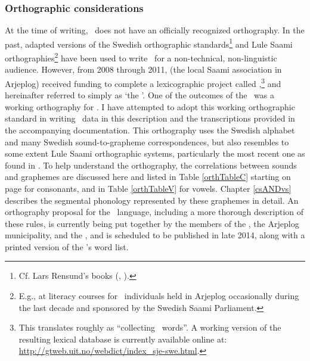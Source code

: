 \subsubsection{Orthographic considerations}\label{orthography}
At the time of writing, \PS\ does not have an officially recognized orthography. In the past, adapted versions of the Swedish orthographic standards\footnote{Cf. Lars Rensund’s books (\cite{Rensund1982}, \citeyear{Rensund1986}).} 
and Lule Saami orthographies\footnote{E.g., at literacy courses for \PS\ individuals held in Arjeplog occasionally during the last decade and sponsored by the Swedish Saami Parliament.} 
have been used to write \PS\ for a non-technical, non-linguistic audience. However, from 2008 through 2011,  (the local Saami association in Arjeplog) received funding to complete a lexicographic project called ,\footnote{This translates roughly as “collecting \PS\ words”. A working version of the resulting lexical database is currently available online at: \href{http://gtweb.uit.no/webdict/index_sje-swe.html}{http://gtweb.uit.no/webdict/index\_sje-swe.html}.} 
\citep[cf.][]{insamlingPS2011} 
and hereinafter referred to simply as ‘the \WLP’. 
One of the outcomes of the \WLP\ was a working orthography for \PS. 
I have attempted to adopt this working orthographic standard in writing \PS\ data in this description and the transcriptions provided in the accompanying documentation. This orthography uses the Swedish alphabet and many Swedish sound-to-grapheme correspondences, but also resembles to some extent Lule Saami orthographic systems, particularly the most recent one as found in \citet{KorhonenO2005}. To help understand the orthography, the correlations between sounds and graphemes are discussed here and listed in Table \ref{orthTableC} starting on page \pageref{orthTableCbegin} for consonants, and in Table \vref{orthTableV} for vowels. %
Chapter \ref{csANDvs} describes the segmental phonology represented by these graphemes in detail. 
An orthography proposal for the \PS\ language, including a more thorough description of these rules, is currently being put together by the members of the \WLP, the Arjeplog municipality, and the \PSDP, and is scheduled to be published in late 2014, along with a printed version of the \WLP’s word list.

